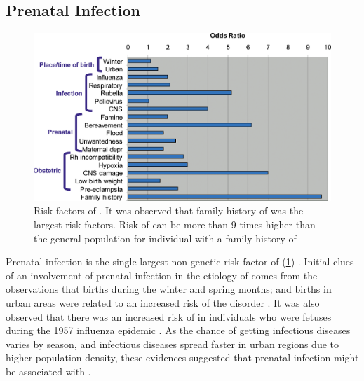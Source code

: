 	\subsection{Prenatal Infection}
	\begin{figure}
		\centering
		\includegraphics[width=\textwidth]{figure/risk_factors_of_schizophrenia.png}
		\caption[Risk factors of ]{Risk factors of .
			It was observed that family history of  was the largest risk factors.
			Risk of  can be more than 9 times higher than the general population for individual with a family history of }
		\label{fig:riskfactors}
	\end{figure}
	Prenatal infection is the single largest non-genetic risk factor of  (\cref{fig:riskfactors}) \citep{Sullivan2005}.
	Initial clues of an involvement of prenatal infection in the etiology of  comes from the observations that births during the winter and spring months; and births in urban areas were related to an increased risk of the disorder \citep{Brown2010}.
	It was also observed that there was an increased risk of  in individuals who were fetuses during the 1957 influenza epidemic \citep{Mednick1958}.
	As the chance of getting infectious diseases varies by season, and infectious diseases spread faster in urban regions due to higher population density, these evidences suggested that prenatal infection might be associated with .
	
